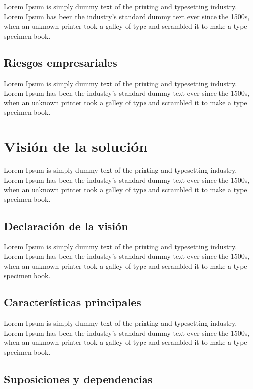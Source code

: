 \documentclass[12pt]{article}
\begin{document}
Lorem Ipsum is simply dummy text of the printing and typesetting industry. Lorem Ipsum has been the industry's standard dummy text ever since the 1500s, when an unknown printer took a galley of type and scrambled it to make a type specimen book.

\subsection{Riesgos empresariales}\label{re}

Lorem Ipsum is simply dummy text of the printing and typesetting industry. Lorem Ipsum has been the industry's standard dummy text ever since the 1500s, when an unknown printer took a galley of type and scrambled it to make a type specimen book.

\section{Visión de la solución}

Lorem Ipsum is simply dummy text of the printing and typesetting industry. Lorem Ipsum has been the industry's standard dummy text ever since the 1500s, when an unknown printer took a galley of type and scrambled it to make a type specimen book.
 
\subsection{Declaración de la visión}\label{ant}

Lorem Ipsum is simply dummy text of the printing and typesetting industry. Lorem Ipsum has been the industry's standard dummy text ever since the 1500s, when an unknown printer took a galley of type and scrambled it to make a type specimen book.

\subsection{Características principales}\label{on}

Lorem Ipsum is simply dummy text of the printing and typesetting industry. Lorem Ipsum has been the industry's standard dummy text ever since the 1500s, when an unknown printer took a galley of type and scrambled it to make a type specimen book.

\subsection{Suposiciones y dependencias}\label{occe}
\end{document}
